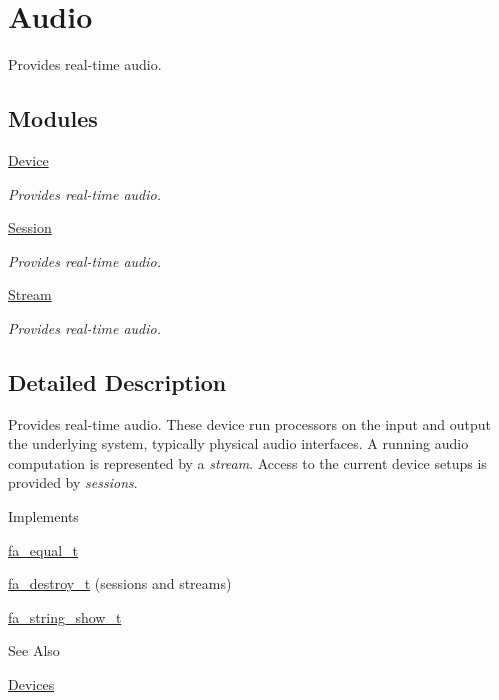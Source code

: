\hypertarget{group___fa_audio}{\section{Audio}
\label{group___fa_audio}
}


Provides real-\/time audio.  


\subsection*{Modules}
\begin{DoxyCompactItemize}
\item 
\hyperlink{group___fa_audio_device}{Device}
\begin{DoxyCompactList}\small\item\em Provides real-\/time audio. \end{DoxyCompactList}\item 
\hyperlink{group___fa_audio_session}{Session}
\begin{DoxyCompactList}\small\item\em Provides real-\/time audio. \end{DoxyCompactList}\item 
\hyperlink{group___fa_audio_stream}{Stream}
\begin{DoxyCompactList}\small\item\em Provides real-\/time audio. \end{DoxyCompactList}\end{DoxyCompactItemize}


\subsection{Detailed Description}
Provides real-\/time audio. These device run processors on the input and output the underlying system, typically physical audio interfaces. A running audio computation is represented by a {\itshape stream}. Access to the current device setups is provided by {\itshape sessions}.

\begin{DoxyParagraph}{Implements}

\begin{DoxyItemize}
\item \hyperlink{structfa__equal__t}{fa\-\_\-equal\-\_\-t}
\item \hyperlink{structfa__destroy__t}{fa\-\_\-destroy\-\_\-t} (sessions and streams)
\item \hyperlink{structfa__string__show__t}{fa\-\_\-string\-\_\-show\-\_\-t}
\end{DoxyItemize}
\end{DoxyParagraph}
\begin{DoxySeeAlso}{See Also}

\begin{DoxyItemize}
\item \hyperlink{md__devices_Devices}{Devices} 
\end{DoxyItemize}
\end{DoxySeeAlso}
